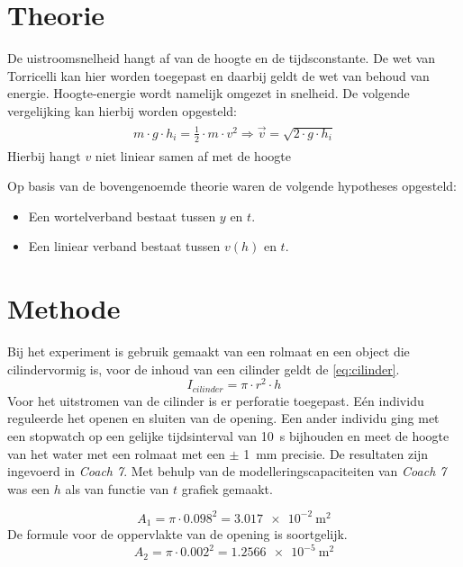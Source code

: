 \documentclass[numbers=endperiod]{scrartcl}
\begin{document}
\newpage
\section{Theorie}
De uistroomsnelheid hangt af van de hoogte en de tijdsconstante. De wet van Torricelli kan hier worden toegepast en daarbij geldt de wet van behoud van energie. Hoogte-energie wordt namelijk omgezet in snelheid. De volgende vergelijking kan hierbij worden opgesteld:
\begin{align}
    \begin{split}
        m \cdot g \cdot h_i = \frac{1}{2} \cdot m \cdot v^2 \Rightarrow
        \vec{v} = \sqrt{2 \cdot g \cdot h_i}
    \end{split}
\end{align}
Hierbij hangt $v$ niet liniear samen af met de hoogte

Op basis van de bovengenoemde theorie waren de volgende hypotheses opgesteld:
\begin{itemize}
 \renewcommand{\labelitemi}{\scriptsize$\blacksquare$}
    \item Een wortelverband bestaat tussen $y$ en $t$.
    \item Een liniear verband bestaat tussen $v(h)$ en $t$.
\end{itemize}

\newpage
\section{Methode}
Bij het experiment is gebruik gemaakt van een rolmaat en een object die cilindervormig is, voor de inhoud van een cilinder geldt de \ref{eq:cilinder}. 
\begin{equation}\label{eq:cilinder}
    I_{cilinder} = \pi \cdot r^2 \cdot h
\end{equation}
Voor het uitstromen van de cilinder is er perforatie toegepast. Eén individu  reguleerde het openen en sluiten van de opening. Een ander individu ging met een stopwatch op een gelijke tijdsinterval van \SI{10}{\second} bijhouden en meet de hoogte van het water met een rolmaat met een $\pm$ \SI{1}{\milli\meter} precisie. De resultaten zijn ingevoerd in \textit{Coach 7}. Met behulp van de modelleringscapaciteiten van \textit{Coach 7} was een $h$ als van functie van $t$ grafiek gemaakt.  






\begin{equation}
    A_1 = \pi \cdot 0.098^2 = \SI{3.017e-2}{\meter\squared}
\end{equation}
 De formule voor de oppervlakte van de opening is soortgelijk.
\begin{equation}
    A_2 = \pi \cdot 0.002^2 = \SI{1.2566e-5}{\meter\squared}
\end{equation}
\end{document}
